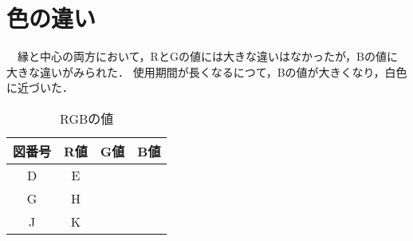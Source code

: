 \documentclass[main]{subfiles}
\begin{document}
\section{色の違い}

　縁と中心の両方において，RとGの値には大きな違いはなかったが，Bの値に大きな違いがみられた．
使用期間が長くなるにつて，Bの値が大きくなり，白色に近づいた．


\begin{table}[h]
    \caption{RGBの値}
    \label{table:SpeedOfLight}
    \centering
\begin{tabular}{|c|c|c|c|}
   \hline
   図番号 & R値 & G値 & B値 \\ \hline
   D & E & & \\ \hline
   G & H & & \\ \hline
   J & K & & \\ \hline
\end{tabular}    
\end{table}
\end{document}
